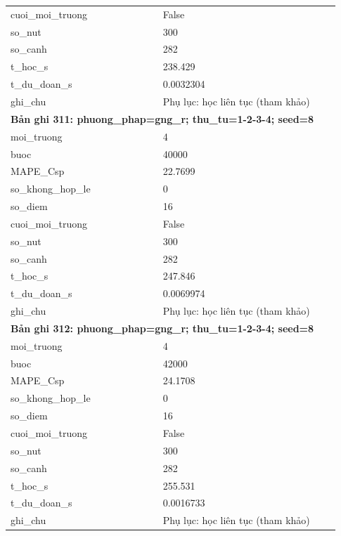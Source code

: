 \begin{longtable}{p{0.43\linewidth}p{0.50\linewidth}}
cuoi\_\allowbreak moi\_\allowbreak truong & False \\
so\_\allowbreak nut & 300 \\
so\_\allowbreak canh & 282 \\
t\_\allowbreak hoc\_\allowbreak s & 238.429 \\
t\_\allowbreak du\_\allowbreak doan\_\allowbreak s & 0.0032304 \\
ghi\_\allowbreak chu & Phụ lục: học liên tục (tham khảo) \\
\midrule
\multicolumn{2}{p{0.95\linewidth}}{\textbf{Bản ghi 311: phuong\_phap=gng\_r; thu\_tu=1-2-3-4; seed=8}} \\
moi\_\allowbreak truong & 4 \\
buoc & 40000 \\
MAPE\_\allowbreak Csp & 22.7699 \\
so\_\allowbreak khong\_\allowbreak hop\_\allowbreak le & 0 \\
so\_\allowbreak diem & 16 \\
cuoi\_\allowbreak moi\_\allowbreak truong & False \\
so\_\allowbreak nut & 300 \\
so\_\allowbreak canh & 282 \\
t\_\allowbreak hoc\_\allowbreak s & 247.846 \\
t\_\allowbreak du\_\allowbreak doan\_\allowbreak s & 0.0069974 \\
ghi\_\allowbreak chu & Phụ lục: học liên tục (tham khảo) \\
\midrule
\multicolumn{2}{p{0.95\linewidth}}{\textbf{Bản ghi 312: phuong\_phap=gng\_r; thu\_tu=1-2-3-4; seed=8}} \\
moi\_\allowbreak truong & 4 \\
buoc & 42000 \\
MAPE\_\allowbreak Csp & 24.1708 \\
so\_\allowbreak khong\_\allowbreak hop\_\allowbreak le & 0 \\
so\_\allowbreak diem & 16 \\
cuoi\_\allowbreak moi\_\allowbreak truong & False \\
so\_\allowbreak nut & 300 \\
so\_\allowbreak canh & 282 \\
t\_\allowbreak hoc\_\allowbreak s & 255.531 \\
t\_\allowbreak du\_\allowbreak doan\_\allowbreak s & 0.0016733 \\
ghi\_\allowbreak chu & Phụ lục: học liên tục (tham khảo) \\

\end{longtable}
